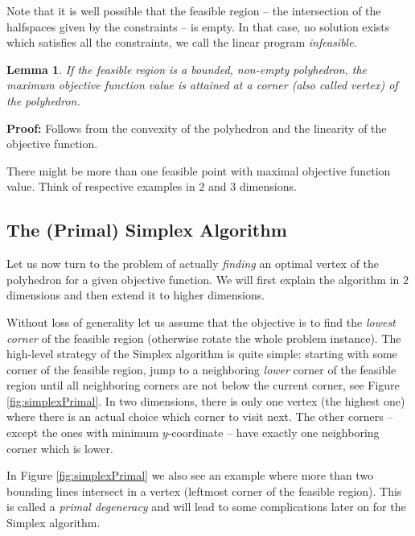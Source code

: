 \documentclass{article}
\newtheorem{lemma}{Lemma}
\begin{document}
Note that it is well possible that the feasible region -- the intersection
of the halfspaces given by the constraints -- is empty. In that case, no solution
exists which satisfies all the constraints, we call the linear program \emph{infeasible}.

\begin{lemma}
If the feasible region is a bounded, non-empty polyhedron, 
the maximum objective function value is 	attained at a corner (also called \emph{vertex})
 of the polyhedron.
\end{lemma}
{\bf Proof:} Follows from the convexity of the polyhedron and the 
linearity of the objective function.

There might be more than one feasible point with maximal objective function value. Think
of respective examples in $2$ and $3$ dimensions.


\subsection{The (Primal) Simplex Algorithm}
Let us now turn to the problem of actually \emph{finding} an optimal vertex of the polyhedron for a given objective function. We will first explain the algorithm in $2$ dimensions and then extend it to higher dimensions.

Without loss of generality let us assume that the objective is to find the \emph{lowest corner} of the feasible region (otherwise rotate the whole problem instance). The high-level strategy of the Simplex algorithm is quite simple:
starting with some corner of the feasible region, jump to a neighboring \emph{lower} corner of the feasible region until all neighboring corners are not below the current corner, see Figure \ref{fig:simplexPrimal}. In two dimensions, there is only one vertex (the highest one) where there is an actual choice which corner to visit next. The other corners -- except the ones with minimum $y$-coordinate -- have exactly one neighboring corner which is lower.

In Figure \ref{fig:simplexPrimal} we also see an example where more than two bounding lines intersect in a vertex (leftmost corner of the feasible region). This is called a \emph{primal degeneracy} and will lead to some complications later on for the Simplex algorithm.
\end{document}
